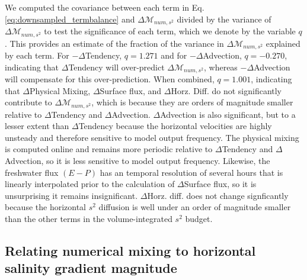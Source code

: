 \documentclass[draft]{agujournal2019}
\begin{document}
We computed the covariance between each term in Eq. \ref{eq:downsampled_termbalance} and $\Delta \mathcal{M}_{num, s^2}$ divided by the variance of $\Delta \mathcal{M}_{num, s^2}$ to test the significance of each term, which we denote by the variable $q$. This provides an estimate of the fraction of the variance in $\Delta \mathcal{M}_{num, s^2}$ explained by each term. For $-\Delta$Tendency, $q = 1.271$ and for $-\Delta$Advection, $q = -0.270$, indicating that $\Delta$Tendency will over-predict $\Delta \mathcal{M}_{num, s^2}$, whereas $-\Delta$Advection will compensate for this over-prediction. When combined, $q = 1.001$, indicating that $\Delta$Physical Mixing, $\Delta$Surface flux, and $\Delta$Horz. Diff. do not significantly contribute to $\Delta \mathcal{M}_{num, s^2}$, which is because they are orders of magnitude smaller relative to $\Delta$Tendency and $\Delta$Advection. $\Delta$Advection is also significant, but to a lesser extent than $\Delta$Tendency because the horizontal velocities are highly unsteady and therefore sensitive to model output frequency. The physical mixing is computed online and remains more periodic relative to $\Delta$Tendency and $\Delta$Advection, so it is less sensitive to model output frequency. Likewise, the freshwater flux $(E-P)$ has an temporal resolution of several hours that is linearly interpolated prior to the calculation of $\Delta$Surface flux, so it is unsurprising it remains insignificant. $\Delta$Horz. diff. does not change signficantly because the horizontal $s^2$ diffusion is well under an order of magnitude smaller than the other terms in the volume-integrated $s^2$ budget. 

\subsection{Relating numerical mixing to horizontal salinity gradient magnitude} \label{sec:salinity_gradient_mag}
\end{document}

